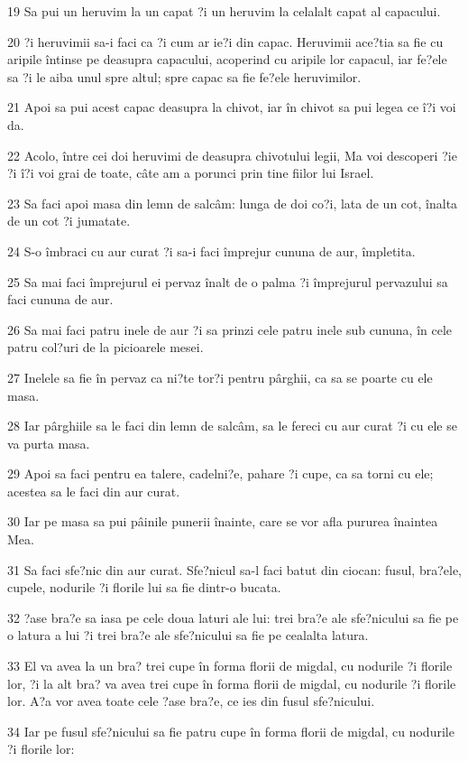 \par 19 Sa pui un heruvim la un capat ?i un heruvim la celalalt capat al capacului.
\par 20 ?i heruvimii sa-i faci ca ?i cum ar ie?i din capac. Heruvimii ace?tia sa fie cu aripile întinse pe deasupra capacului, acoperind cu aripile lor capacul, iar fe?ele sa ?i le aiba unul spre altul; spre capac sa fie fe?ele heruvimilor.
\par 21 Apoi sa pui acest capac deasupra la chivot, iar în chivot sa pui legea ce î?i voi da.
\par 22 Acolo, între cei doi heruvimi de deasupra chivotului legii, Ma voi descoperi ?ie ?i î?i voi grai de toate, câte am a porunci prin tine fiilor lui Israel.
\par 23 Sa faci apoi masa din lemn de salcâm: lunga de doi co?i, lata de un cot, înalta de un cot ?i jumatate.
\par 24 S-o îmbraci cu aur curat ?i sa-i faci împrejur cununa de aur, împletita.
\par 25 Sa mai faci împrejurul ei pervaz înalt de o palma ?i împrejurul pervazului sa faci cununa de aur.
\par 26 Sa mai faci patru inele de aur ?i sa prinzi cele patru inele sub cununa, în cele patru col?uri de la picioarele mesei.
\par 27 Inelele sa fie în pervaz ca ni?te tor?i pentru pârghii, ca sa se poarte cu ele masa.
\par 28 Iar pârghiile sa le faci din lemn de salcâm, sa le fereci cu aur curat ?i cu ele se va purta masa.
\par 29 Apoi sa faci pentru ea talere, cadelni?e, pahare ?i cupe, ca sa torni cu ele; acestea sa le faci din aur curat.
\par 30 Iar pe masa sa pui pâinile punerii înainte, care se vor afla pururea înaintea Mea.
\par 31 Sa faci sfe?nic din aur curat. Sfe?nicul sa-l faci batut din ciocan: fusul, bra?ele, cupele, nodurile ?i florile lui sa fie dintr-o bucata.
\par 32 ?ase bra?e sa iasa pe cele doua laturi ale lui: trei bra?e ale sfe?nicului sa fie pe o latura a lui ?i trei bra?e ale sfe?nicului sa fie pe cealalta latura.
\par 33 El va avea la un bra? trei cupe în forma florii de migdal, cu nodurile ?i florile lor, ?i la alt bra? va avea trei cupe în forma florii de migdal, cu nodurile ?i florile lor. A?a vor avea toate cele ?ase bra?e, ce ies din fusul sfe?nicului.
\par 34 Iar pe fusul sfe?nicului sa fie patru cupe în forma florii de migdal, cu nodurile ?i florile lor:
